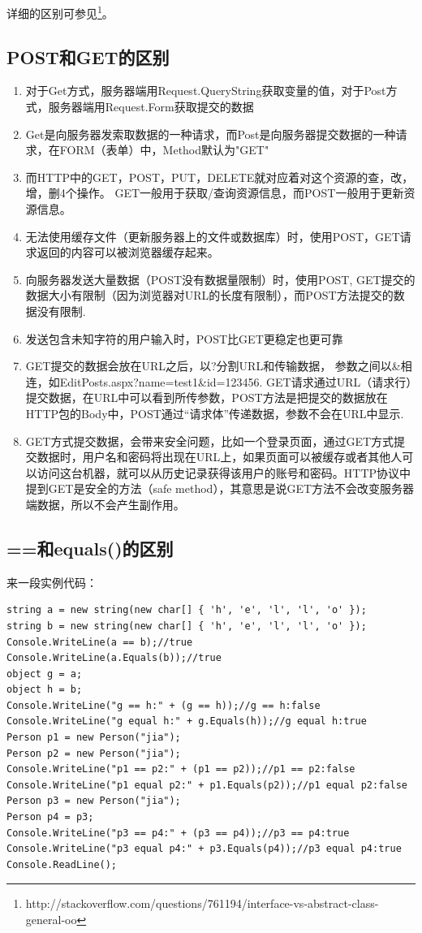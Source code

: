 \documentclass{book}
\begin{document}
详细的区别可参见\footnote{http://stackoverflow.com/questions/761194/interface-vs-abstract-class-general-oo}。

\subsection{POST和GET的区别}

\begin{enumerate}
\setcounter{enumi}{0}
\item{对于Get方式，服务器端用Request.QueryString获取变量的值，对于Post方式，服务器端用Request.Form获取提交的数据}
\item{Get是向服务器发索取数据的一种请求，而Post是向服务器提交数据的一种请求，在FORM（表单）中，Method默认为"GET"}
\item{而HTTP中的GET，POST，PUT，DELETE就对应着对这个资源的查，改，增，删4个操作。
GET一般用于获取/查询资源信息，而POST一般用于更新资源信息。}
\item{无法使用缓存文件（更新服务器上的文件或数据库）时，使用POST，GET请求返回的内容可以被浏览器缓存起来。}
\item{向服务器发送大量数据（POST没有数据量限制）时，使用POST,
GET提交的数据大小有限制（因为浏览器对URL的长度有限制），而POST方法提交的数据没有限制.}
\item{发送包含未知字符的用户输入时，POST比GET更稳定也更可靠}
\item{GET提交的数据会放在URL之后，以?分割URL和传输数据，
参数之间以\&相连，如EditPosts.aspx?name=test1\&id=123456.
GET请求通过URL（请求行）提交数据，在URL中可以看到所传参数，POST方法是把提交的数据放在HTTP包的Body中，POST通过“请求体”传递数据，参数不会在URL中显示.}
\item{GET方式提交数据，会带来安全问题，比如一个登录页面，通过GET方式提交数据时，用户名和密码将出现在URL上，如果页面可以被缓存或者其他人可以访问这台机器，就可以从历史记录获得该用户的账号和密码。HTTP协议中提到GET是安全的方法（safe method），其意思是说GET方法不会改变服务器端数据，所以不会产生副作用。}
\end{enumerate}

\subsection{==和equals()的区别}

来一段实例代码：

\begin{lstlisting}[language={[Sharp]C}]
string a = new string(new char[] { 'h', 'e', 'l', 'l', 'o' });
string b = new string(new char[] { 'h', 'e', 'l', 'l', 'o' });
Console.WriteLine(a == b);//true
Console.WriteLine(a.Equals(b));//true
object g = a;
object h = b;
Console.WriteLine("g == h:" + (g == h));//g == h:false
Console.WriteLine("g equal h:" + g.Equals(h));//g equal h:true
Person p1 = new Person("jia");
Person p2 = new Person("jia");
Console.WriteLine("p1 == p2:" + (p1 == p2));//p1 == p2:false
Console.WriteLine("p1 equal p2:" + p1.Equals(p2));//p1 equal p2:false
Person p3 = new Person("jia");
Person p4 = p3;
Console.WriteLine("p3 == p4:" + (p3 == p4));//p3 == p4:true
Console.WriteLine("p3 equal p4:" + p3.Equals(p4));//p3 equal p4:true
Console.ReadLine();
\end{lstlisting}
\end{document}
